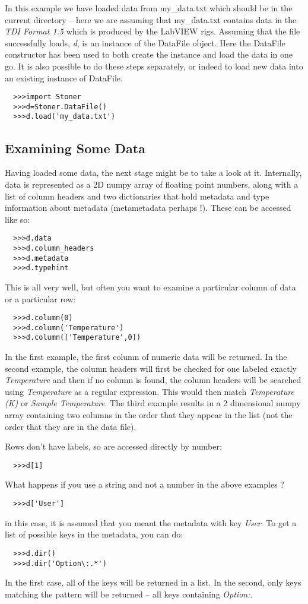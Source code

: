 \documentclass[a4paper,11pt]{scrartcl}
\begin{document}
In this example we have loaded data from my\_data.txt which should be in the current directory -- here we are assuming that my\_data.txt contains data in the \textit{TDI Format 1.5} which is produced by the LabVIEW rigs. Assuming that the file successfully loads, \textit{d}, is an instance of the DataFile object. Here the DataFile constructor has been used to both create the instance and load the data in one go. It is also possible to do these steps separately, or indeed to load new data into an existing instance of DataFile.

\begin{verbatim}
  >>>import Stoner
  >>>d=Stoner.DataFile()
  >>>d.load('my_data.txt')
\end{verbatim}

\subsection{Examining Some Data}

Having loaded some data, the next stage might be to take a look at it. Internally, data is represented as a 2D numpy array of floating point numbers, along with a list of column headers and two dictionaries that hold metadata and type information about metadata (metametadata perhaps !). These can be accessed like so:
\begin{verbatim}
  >>>d.data
  >>>d.column_headers
  >>>d.metadata
  >>>d.typehint
\end{verbatim}
This is all very well, but often you want to examine a particular column of data or a particular row:
\begin{verbatim}
  >>>d.column(0)
  >>>d.column('Temperature')
  >>>d.column(['Temperature',0])
\end{verbatim}
In the first example, the first column of numeric data will be returned. In the second example, the column headers will first be checked for one labeled exactly \textit{Temperature} and then if no column is found, the column headers will be searched using \textit{Temperature} as a regular expression. This would then match \textit{Temperature (K)} or \textit{Sample Temperature}.  The third example results in a 2 dimensional numpy array containing two columns in the order that they appear in the list (\ie not the order that they are in the data file).

Rows don't have labels, so are accessed directly by number:
\begin{verbatim}
  >>>d[1]
\end{verbatim}
What happens if you use a string and not a number in the above examples ?
\begin{verbatim}
  >>>d['User']
\end{verbatim}
in this case, it is assumed that you meant the metadata with key \textit{User}. To get a list of possible keys in the metadata, you can do:
\begin{verbatim}
  >>>d.dir()
  >>>d.dir('Option\:.*')
\end{verbatim}
In the first case, all of the keys will be returned in a list. In the second, only keys matching the pattern will be returned -- all keys containing \textit{Option:}.
\end{document}
